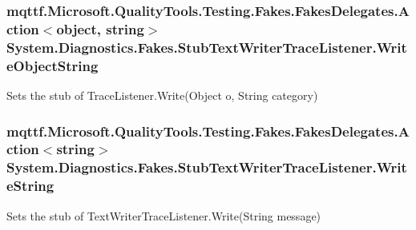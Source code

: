 \hypertarget{class_system_1_1_diagnostics_1_1_fakes_1_1_stub_text_writer_trace_listener_af942eaa96060fd97eb9437a4d9e5d4ec}{
\subsubsection[{Write\-Object\-String}]{\setlength{\rightskip}{0pt plus 5cm}mqttf.\-Microsoft.\-Quality\-Tools.\-Testing.\-Fakes.\-Fakes\-Delegates.\-Action$<$object, string$>$ System.\-Diagnostics.\-Fakes.\-Stub\-Text\-Writer\-Trace\-Listener.\-Write\-Object\-String}}\label{class_system_1_1_diagnostics_1_1_fakes_1_1_stub_text_writer_trace_listener_af942eaa96060fd97eb9437a4d9e5d4ec}


Sets the stub of Trace\-Listener.\-Write(\-Object o, String category)

\hypertarget{class_system_1_1_diagnostics_1_1_fakes_1_1_stub_text_writer_trace_listener_aebaa5b564516b9cbb4db49a09d451faa}{
\subsubsection[{Write\-String}]{\setlength{\rightskip}{0pt plus 5cm}mqttf.\-Microsoft.\-Quality\-Tools.\-Testing.\-Fakes.\-Fakes\-Delegates.\-Action$<$string$>$ System.\-Diagnostics.\-Fakes.\-Stub\-Text\-Writer\-Trace\-Listener.\-Write\-String}}\label{class_system_1_1_diagnostics_1_1_fakes_1_1_stub_text_writer_trace_listener_aebaa5b564516b9cbb4db49a09d451faa}


Sets the stub of Text\-Writer\-Trace\-Listener.\-Write(\-String message)

